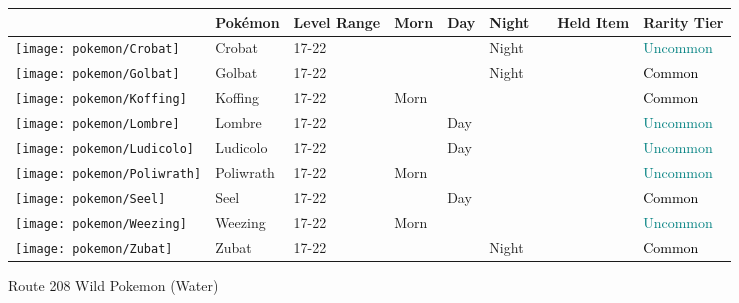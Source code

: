 \begin{longtable}{||l l l l l l l l l||}%
\hline%
&Pokémon&Level Range&Morn&Day&Night&&Held Item&Rarity Tier\\%
\hline%
\endhead%
\hline%
\texttt{[image: pokemon/Crobat]}&Crobat&17{-}22&&&Night&&&\textcolor{teal}{%
Uncommon%
}\\%
\hline%
\texttt{[image: pokemon/Golbat]}&Golbat&17{-}22&&&Night&&&\textcolor{black}{%
Common%
}\\%
\hline%
\texttt{[image: pokemon/Koffing]}&Koffing&17{-}22&Morn&&&&&\textcolor{black}{%
Common%
}\\%
\hline%
\texttt{[image: pokemon/Lombre]}&Lombre&17{-}22&&Day&&&&\textcolor{teal}{%
Uncommon%
}\\%
\hline%
\texttt{[image: pokemon/Ludicolo]}&Ludicolo&17{-}22&&Day&&&&\textcolor{teal}{%
Uncommon%
}\\%
\hline%
\texttt{[image: pokemon/Poliwrath]}&Poliwrath&17{-}22&Morn&&&&&\textcolor{teal}{%
Uncommon%
}\\%
\hline%
\texttt{[image: pokemon/Seel]}&Seel&17{-}22&&Day&&&&\textcolor{black}{%
Common%
}\\%
\hline%
\texttt{[image: pokemon/Weezing]}&Weezing&17{-}22&Morn&&&&&\textcolor{teal}{%
Uncommon%
}\\%
\hline%
\texttt{[image: pokemon/Zubat]}&Zubat&17{-}22&&&Night&&&\textcolor{black}{%
Common%
}\\%
\hline%
\end{longtable}%
\caption{Route 208 Wild Pokemon (Water)}